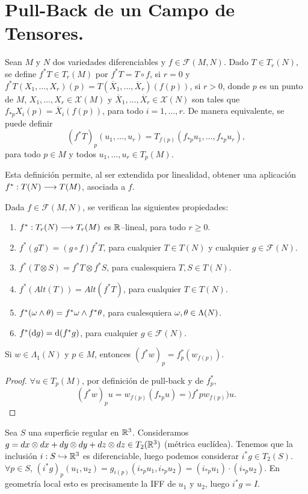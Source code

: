 \documentclass[cursovd_portada.tex]{subfiles}
\begin{document}
\section{Pull-Back de un Campo de Tensores.}
\begin{defi}
Sean $M$ y $N$ dos variedades diferenciables y
$f\in\mathcal{F}(M,N)$. Dado $T\in T_r(N)$, se define $f^*T\in
T_r(M)$ por $f^*T=T\circ f$, si $r=0$ y $f^*T(X_1,\dots ,X_r)(p)=
T(\overline{X}_1,\dots ,\overline{X}_r)(f(p))$, si $r>0$, donde
$p$ es un punto de $M$, $X_1,\dots ,X_r\in\mathcal{X}(M)$ y
$\overline{X}_1,\dots ,\overline{X}_r\in\mathcal{X}(N)$ son tales
que $f_{*p}X_i(p)=\overline{X}_i(f(p))$, para todo $i=1,\dots ,r$.
De manera equivalente, se puede definir
$$(f^*T)_p(u_1,\dots,u_r)=T_{f(p)}(f_{*p}u_1,\dots,f_{*p}u_r),$$
para todo $p\in M$ y todos $u_1,\dots,u_r \in T_p(M)$.
\end{defi}
Esta definición permite, al ser extendida por linealidad, obtener una aplicación $f^*:T(N)\longrightarrow T(M)$, asociada a
$f$.
\begin{prop}
Dada $f\in\mathcal{F}(M,N)$, se verifican las siguientes
propiedades:
\begin{enumerate}
\item $f^*:T_r(N)\longrightarrow T_r(M)$ es $\mathbb{R}$--lineal, para todo $r\geq 0$.
\item $f^*(gT)=(g\circ f)f^*T$, para cualquier $T\in T(N)$ y
cualquier $g\in \mathcal{F}(N)$. \item $f^*(T\otimes
S)=f^*T\otimes f^*S$, para cualesquiera $T,S\in T(N)$. \item
$f^*(Alt(T))=Alt(f^*T)$, para cualquier $T\in T(N)$. \item
$f^*(\omega\wedge\theta)=f^*\omega\wedge f^*\theta$, para cualesquiera
$\omega,\theta\in\Lambda(N)$. \item $f^*({\rm d} g)={\rm d} (f^*g)$, para
cualquier $g\in\mathcal{F}(N)$.
\end{enumerate}
\end{prop}

\begin{nota}
Si $w\in\Lambda_1(N)$ y $p\in M$, entonces $(f^*w)_p=f^*_p(w_{f(p)})$.
\begin{proof}
$\forall u\in T_p(M)$, por definición de pull-back y de $f^*_p$,
$$(f^*w)_pu=w_{f(p)}(f_{*p}u)=)f^*pw_{f(p)})u.$$
\end{proof}
\end{nota}

\begin{ej}
Sea $S$ una superficie regular en $\mathbb{R}^3$. Consideramos $g=dx\otimes dx + dy\otimes dy + dz\otimes dz\in T_2(\mathbb{R}^3)$ (métrica euclídea).
Tenemos que la inclusión $i:S\hookrightarrow \mathbb{R}^3$ es diferenciable, luego podemos considerar $i^*g\in T_2(S)$. $\forall p\in S$, $(i^* g)_p(u_1,u_2)=g_{i(p)}(i_{*p}u_1,i_{*p}u_2)=(i_{*p}u_1)\cdot (i_{*p}u_2)$. En geometría local esto es precisamente la IFF de $u_1$ y $u_2$, luego $i^*g=I$. 
\end{ej}
\end{document}
